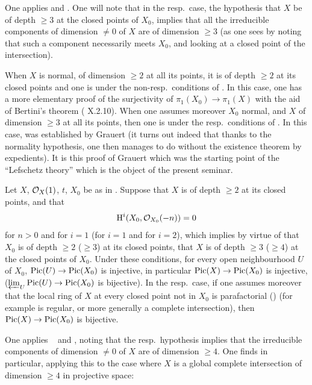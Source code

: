 One applies  and . One will note that in the resp.\ case, the hypothesis that $X$ be of depth $\geq 3$ at the closed points of $X_0$, implies that all the irreducible components of dimension $\neq 0$ of $X$ are of dimension $\geq 3$ (as one sees by noting that such a component necessarily meets $X_0$, and looking at a closed point of the intersection).

\begin{remarkstar}
When $X$ is normal, of dimension $\geq 2$ at all its points, it is of depth $\geq 2$ at its closed points and one is under the non-resp.\ conditions of . In this case, one has a more elementary proof of the surjectivity of $\pi_1(X_0)\to \pi_1(X)$ with the aid of Bertini's theorem (\cf {} X.2.10). When one assumes moreover $X_0$ normal, and $X$ of dimension $\geq 3$ at all its points, then one is under the resp.\ conditions of . In this case,  was established by Grauert (it turns out indeed that thanks to the normality hypothesis, one then manages to do without the existence theorem  by expedients). It is this proof of Grauert which was the starting point of the ``Lefschetz theory'' which is the object of the present seminar.
\end{remarkstar}

\begin{corollary} \label{XII.3.6} Let $X$, $\mathcal{O}_X(1)$, $t$, $X_0$ be as in . Suppose that $X$ is of depth $\geq 2$ at its closed points, and that
\[
\operatorname{H}^i(X_0, {\mathcal O}_{X_0}(-n))=0
\]
for $n>0$ and for $i=1$ (\resp for $i=1$ and for $i=2$), which implies by virtue of  that $X_0$ is of depth $\geq 2$ (\resp $\geq 3$) at its closed points, \ie that $X$ is of depth $\geq 3$ (\resp $\geq 4$) at the closed points of $X_0$. Under these conditions, for every open neighbourhood $U$ of $X_0$, $\Pic(U)\to\Pic(X_0)$ is injective, in particular $\Pic(X)\to\Pic(X_0)$ is injective, (\resp $\varprojlim_U \Pic(U)\to\Pic(X_0)$ is bijective). In the resp.\ case, if one assumes moreover that the local ring of $X$ at every closed point not in $X_0$ is parafactorial () (for example is regular, or more generally a complete intersection), then $\Pic(X)\to\Pic(X_0)$ is bijective.
\end{corollary}
One applies ~ and , noting that the resp.\ hypothesis implies that the irreducible components of dimension $\neq 0$ of $X$ are of dimension $\geq 4$. One finds in particular, applying this to the case where $X$ is a global complete intersection of dimension $\geq 4$ in projective space:


